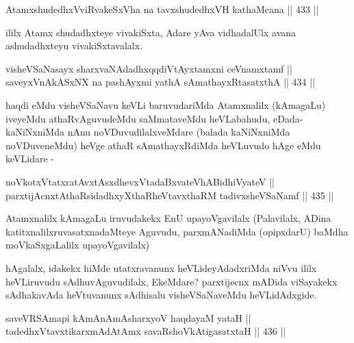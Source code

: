 
\begin{shl}
AtamxshudedhxVviRvakeSxVha na tavxshudedhxVH kathaMcana \hfill || 433 ||
\end{shl}

\begin{artha}
ililx Atamx shudadhxteye vivakiSxta, Adare yAva vidhadalUlx avana ashudadhxteyu vivakiSxtavalalx.
\end{artha}


\begin{shl}
visheVSaNasayx sharxvaNAdadhxqqdiVtAyxtamxni ceVnamxtamf || \\
saveyxVnAkASxNX na pashAyxmi yathA sAmathayxRtasatxthA \hfill || 434 ||  
\end{shl}

\begin{artha}
haqdi eMdu visheVSaNavu keVLi baruvudariMda Atamxnalilx
(kAmagaLu) iveyeMdu athaRvAguvudeMdu saMmataveMdu heVLabahudu,
eDada-kaNiNxniMda nAnu noVDuvudilalxveMdare (balada kaNiNxniMda
noVDuveneMdu) heVge athaR sAmathayxRdiMda heVLuvudo hAge eMdu
keVLidare -
\end{artha}


\begin{shl}
noVkotxVtatxratAvxtAsxdhevxVtadaBxvateVhABidhiVyateV || \\
parxtijAcnxtAthaRsidadhxyXthaRheVtavxthaRM tadivxsheVSaNamf \hfill || 435 ||  
\end{shl}

\begin{artha}
Atamxnalilx kAmagaLu iruvudakekx EnU upayoVgavilalx (Palavilalx, ADina
katitxnalilxruvasatxnadaMteye Aguvudu, parxmANadiMda (opipxdarU)
baMdha moVkaSxgaLalilx upayoVgavilalx)
\end{artha}

\begin{artha}
hAgalalx, idakekx hiMde utatxravanunx heVLideyAdadxriMda niVvu ililx
heVLiruvudu sAdhuvAguvudilalx, EkeMdare? parxtijecnx
mADida viSayakekx sAdhakavAda heVtuvanunx sAdhisalu visheVSaNaveMdu
heVLidAdxgide.
\end{artha}


\begin{shl}
saveVRSAmapi kAmAnAmAsharxyoV haqdayaM yataH || \\
tadedhxVtavxtikarxmAdAtAmx savaRshoVkAtigasatxtaH \hfill || 436 ||  
\end{shl}

